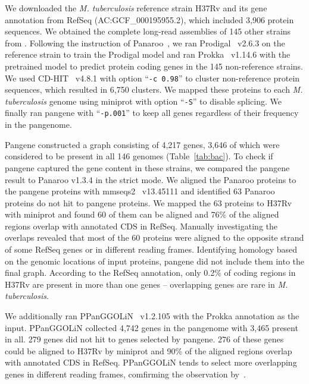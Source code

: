\documentclass{bioinfo}
\begin{document}
We downloaded the \emph{M. tuberculosis} reference strain H37Rv and its gene annotation from RefSeq (AC:GCF\_000195955.2),
which included 3,906 protein sequences.
We obtained the complete long-read assemblies of 145 other strains from \citet{Marin:2022aa}.
Following the instruction of Panaroo~\citep{Tonkin-Hill:2020aa},
we ran Prodigal~\citep{Hyatt:2010aa} v2.6.3 on the reference strain to train the Prodigal model
and ran Prokka~\citep{Seemann:2014aa} v1.14.6 with the pretrained model to predict protein coding genes
in the 145 non-reference strains.
We used CD-HIT~\citep{Li:2006aa,Fu:2012aa} v4.8.1 with option ``{\tt -c 0.98}'' to cluster non-reference protein sequences,
which resulted in 6,750 clusters.
We mapped these proteins to each \emph{M. tuberculosis} genome using miniprot with option ``{\tt -S}'' to disable splicing.
We finally ran pangene with ``{\tt -p.001}''
to keep all genes regardless of their frequency in the pangenome.

Pangene constructed a graph consisting of 4,217 genes,
3,646 of which were considered to be present in all 146 genomes (Table~\ref{tab:bac}).
To check if pangene captured the gene content in these strains,
we compared the pangene result to Panaroo v1.3.4 in the strict mode.
We aligned the Panaroo proteins to the pangene proteins with mmseqs2~\citep{Steinegger:2017aa} v13.45111
and identified 63 Panaroo proteins do not hit to pangene proteins.
We mapped the 63 proteins to H37Rv with miniprot
and found 60 of them can be aligned
and 76\% of the aligned regions overlap with annotated CDS in RefSeq.
Manually investigating the overlaps revealed that most of the 60 proteins
were aligned to the opposite strand of some RefSeq genes or in different reading frames.
Identifying homology based on the genomic locations of input proteins,
pangene did not include them into the final graph.
According to the RefSeq annotation,
only 0.2\% of coding regions in H37Rv are present in more than one genes --
overlapping genes are rare in \emph{M. tuberculosis}.

We additionally ran PPanGGOLiN~\citep{Gautreau:2020aa} v1.2.105 with the Prokka annotation as the input.
PPanGGOLiN collected 4,742 genes in the pangenome with 3,465 present in all.
279 genes did not hit to genes selected by pangene.
276 of these genes could be aligned to H37Rv by miniprot
and 90\% of the aligned regions overlap with annotated CDS in RefSeq.
PPanGGOLiN tends to select more overlapping genes in different reading frames,
comfirming the observation by~\citet{Tonkin-Hill:2020aa}.
\end{document}
